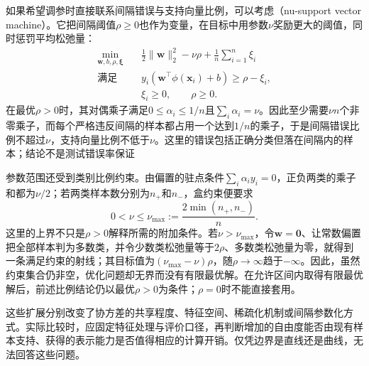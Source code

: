 如果希望调参时直接联系间隔错误与支持向量比例，可以考虑（nu-support vector machine）。它把间隔阈值$\rho\geq0$也作为变量，在目标中用参数$\nu$奖励更大的阈值，同时惩罚平均松弛量：
\begin{equation}
  \begin{aligned}
    \min_{\bm{w},b,\rho,\bm{\xi}}\quad&
      \frac12\lVert\bm{w}\rVert_2^2-\nu\rho
      +\frac1n\sum_{i=1}^n\xi_i\\
    \text{满足}\quad&
      y_i(\bm{w}^{\top}\phi(\bm{x}_i)+b)\geq\rho-\xi_i,\\
    &\xi_i\geq0,\qquad \rho\geq0.
  \end{aligned}
  \label{eq:classification-nu-svm}
\end{equation}
在最优$\rho>0$时，其对偶乘子满足$0\leq\alpha_i\leq1/n$且$\sum_i\alpha_i=\nu$。因此至少需要$\nu n$个非零乘子，而每个严格违反间隔的样本都占用一个达到$1/n$的乘子，于是间隔错误比例不超过$\nu$，支持向量比例不低于$\nu$。这里的错误包括正确分类但落在间隔内的样本；结论不是测试错误率保证

参数范围还受到类别比例约束。由偏置的驻点条件$\sum_i\alpha_i y_i=0$，正负两类的乘子和都为$\nu/2$；若两类样本数分别为$n_+$和$n_-$，盒约束便要求
\[
  0<\nu\leq\nu_{\max}
  :=\frac{2\min(n_+,n_-)}{n}.
\]
这里的上界不只是$\rho>0$解释所需的附加条件。若$\nu>\nu_{\max}$，令$\bm{w}=\bm{0}$、让常数偏置把全部样本判为多数类，并令少数类松弛量等于$2\rho$、多数类松弛量为零，就得到一条满足约束的射线；其目标值为$(\nu_{\max}-\nu)\rho$，随$\rho\to\infty$趋于$-\infty$。因此，虽然约束集合仍非空，优化问题却无界而没有有限最优解。在允许区间内取得有限最优解后，前述比例结论仍以最优$\rho>0$为条件；$\rho=0$时不能直接套用。

这些扩展分别改变了协方差的共享程度、特征空间、稀疏化机制或间隔参数化方式。实际比较时，应固定特征处理与评价口径，再判断增加的自由度能否由现有样本支持、获得的表示能力是否值得相应的计算开销。仅凭边界是直线还是曲线，无法回答这些问题。
